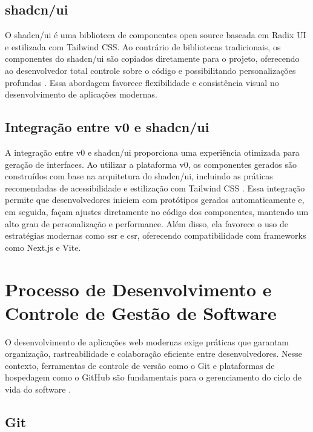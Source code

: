 \subsection{shadcn/ui}
\label{subsec:shadcn}

O shadcn/ui é uma biblioteca de componentes open source baseada em Radix UI e estilizada com Tailwind CSS. Ao contrário de bibliotecas tradicionais, os componentes do shadcn/ui são copiados diretamente para o projeto, oferecendo ao desenvolvedor total controle sobre o código e possibilitando personalizações profundas \cite{shadcn_docs}. Essa abordagem favorece flexibilidade e consistência visual no desenvolvimento de aplicações modernas.

\subsection{Integração entre v0 e shadcn/ui}
\label{subsec:integracao-v0-shadcn}

A integração entre v0 e shadcn/ui proporciona uma experiência otimizada para geração de interfaces. Ao utilizar a plataforma v0, os componentes gerados são construídos com base na arquitetura do shadcn/ui, incluindo as práticas recomendadas de acessibilidade e estilização com Tailwind CSS \cite{v0_docs, shadcn_docs}. Essa integração permite que desenvolvedores iniciem com protótipos gerados automaticamente e, em seguida, façam ajustes diretamente no código dos componentes, mantendo um alto grau de personalização e performance. Além disso, ela favorece o uso de estratégias modernas como \acrshort{ssr} e \acrshort{csr}, oferecendo compatibilidade com frameworks como Next.js e Vite.




\section{Processo de Desenvolvimento e Controle de Gestão de Software}
\label{sec:git-github}

O desenvolvimento de aplicações web modernas exige práticas que garantam organização, rastreabilidade e colaboração eficiente entre desenvolvedores. Nesse contexto, ferramentas de controle de versão como o Git e plataformas de hospedagem como o GitHub são fundamentais para o gerenciamento do ciclo de vida do software \cite{github_official}.

\subsection{Git}
\label{subsec:git}

